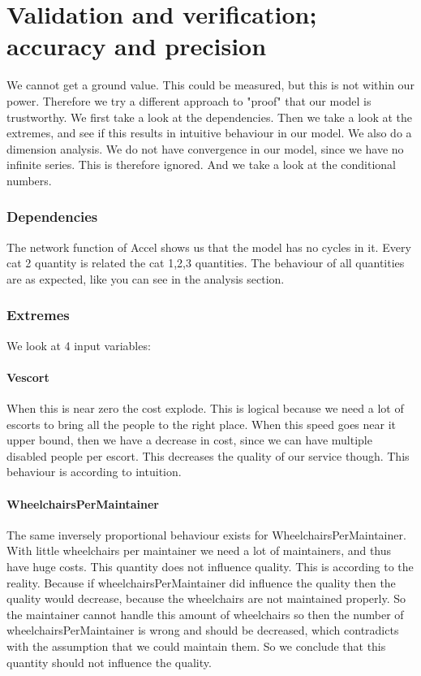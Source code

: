 \documentclass[a4paper, 11pt, notitlepage]{report}
\begin{document}
\chapter{Validation and verification; accuracy and precision}
We cannot get a ground value. This could be measured, but this is not within our power. Therefore we try a different approach to "proof" that our model is trustworthy. We first take a look at the dependencies. Then we take a look at the extremes, and see if this results in intuitive behaviour in our model. We also do a dimension analysis. We do not have convergence in our model, since we have no infinite series. This is therefore ignored. And we take a look at the conditional numbers.

\subsection{Dependencies} The network function of Accel shows us that the model has no cycles in it. Every cat 2 quantity is related the cat 1,2,3 quantities. The behaviour of all quantities are as expected, like you can see in the analysis section.

\subsection{Extremes} We look at 4 input variables:
	\subsubsection{Vescort} When this is near zero the cost explode. This is logical because we need a lot of escorts to bring all the people to the right place. When this speed goes near it upper bound, then we have a decrease in cost, since we can have multiple disabled people per escort. This decreases the quality of our service though. This behaviour is according to intuition.
	\subsubsection{WheelchairsPerMaintainer} The same inversely proportional behaviour exists for WheelchairsPerMaintainer. With little wheelchairs per maintainer we need a lot of maintainers, and thus have huge costs. This quantity does not influence quality. This is according to the reality. Because if wheelchairsPerMaintainer did influence the quality then the quality would decrease, because the wheelchairs are not maintained properly. So the maintainer cannot handle this amount of wheelchairs so then the number of wheelchairsPerMaintainer is wrong and should be decreased, which contradicts with the assumption that we could maintain them. So we conclude that this quantity should not influence the quality.
\end{document}
